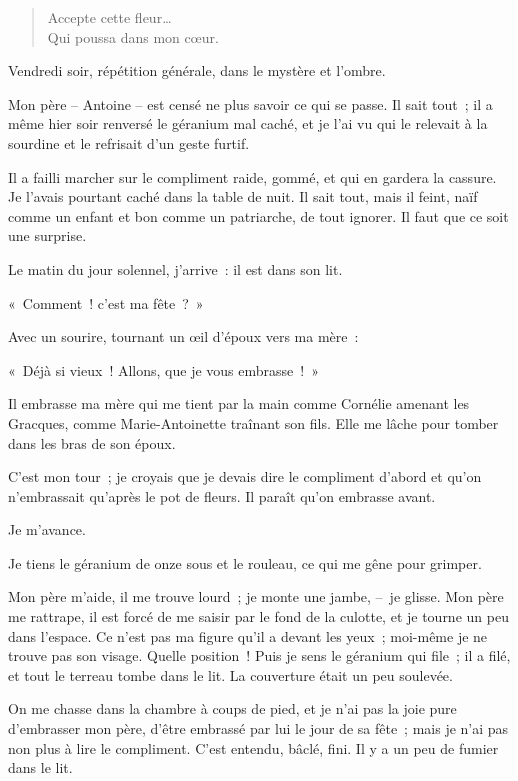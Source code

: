 \documentclass[french,twoside]{book} %
\def\mednobreak{\ifdim\lastskip<\medskipamount
  \removelastskip\nopagebreak\medskip\fi}
\newcommand{\labelblock}[1]{\medbreak{\noindent\color{rubric}\bfseries #1}\par\mednobreak}
\begin{document}
\begin{verse}
Accepte cette fleur…\\
Qui poussa dans mon cœur.\\
\end{verse}


\labelblock{Vendredi soir.}

\noindent Vendredi soir, répétition générale, dans le mystère et l’ombre.\par
Mon père – Antoine – est censé ne plus savoir ce qui se passe. Il sait tout ; il a même hier soir renversé le géranium mal caché, et je l’ai vu qui le relevait à la sourdine et le refrisait d’un geste furtif.\par
Il a failli marcher sur le compliment raide, gommé, et qui en gardera la cassure. Je l’avais pourtant caché dans la table de nuit. Il sait tout, mais il feint, naïf comme un enfant et bon comme un patriarche, de tout ignorer. Il faut que ce soit une surprise.\par
Le matin du jour solennel, j’arrive : il est dans son lit.\par
« Comment ! c’est ma fête ? »\par
Avec un sourire, tournant un œil d’époux vers ma mère :\par
« Déjà si vieux ! Allons, que je vous embrasse ! »\par
Il embrasse ma mère qui me tient par la main comme Cornélie amenant les Gracques, comme Marie-Antoinette traînant son fils. Elle me lâche pour tomber dans les bras de son époux.\par
\bigbreak
\noindent C’est mon tour ; je croyais que je devais dire le compliment d’abord et qu’on n’embrassait qu’après le pot de fleurs. Il paraît qu’on embrasse avant.\par
Je m’avance.\par
Je tiens le géranium de onze sous et le rouleau, ce qui me gêne pour grimper.\par
Mon père m’aide, il me trouve lourd ; je monte une jambe, – je glisse. Mon père me rattrape, il est forcé de me saisir par le fond de la culotte, et je tourne un peu dans l’espace. Ce n’est pas ma figure qu’il a devant les yeux ; moi-même je ne trouve pas son visage. Quelle position ! Puis je sens le géranium qui file ; il a filé, et tout le terreau tombe dans le lit. La couverture était un peu soulevée.\par
On me chasse dans la chambre à coups de pied, et je n’ai pas la joie pure d’embrasser mon père, d’être embrassé par lui le jour de sa fête ; mais je n’ai pas non plus à lire le compliment. C’est entendu, bâclé, fini. Il y a un peu de fumier dans le lit.\par
\end{document}
